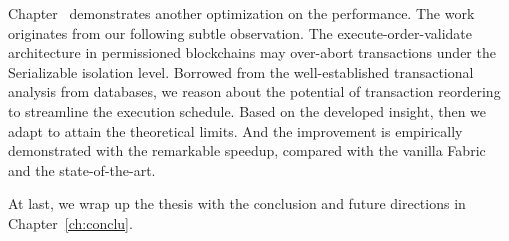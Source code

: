 Chapter~\cite{ch:txn} demonstrates another optimization on the performance. 
The work originates from our following subtle observation. 
The execute-order-validate architecture in permissioned blockchains may over-abort transactions under the Serializable isolation level. 
Borrowed from the well-established transactional analysis from databases, we reason about the potential of transaction reordering to streamline the execution schedule. Based on the developed insight, then we adapt {\fs} to attain the theoretical limits. 
And the improvement is empirically demonstrated with the remarkable speedup, compared with the vanilla Fabric and the state-of-the-art. 

At last, we wrap up the thesis with the conclusion and future directions in Chapter~\autoref{ch:conclu}. 

